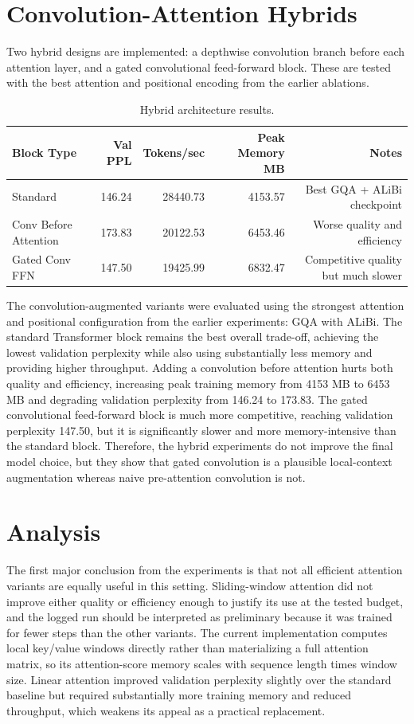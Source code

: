 \documentclass{article}
\begin{document}
\section{Convolution-Attention Hybrids}

Two hybrid designs are implemented: a depthwise convolution branch before each
attention layer, and a gated convolutional feed-forward block. These are tested
with the best attention and positional encoding from the earlier ablations.

\begin{table}[h]
\centering
\begin{tabular}{lrrrr}
\toprule
Block Type & Val PPL & Tokens/sec & Peak Memory MB & Notes \\
\midrule
Standard & 146.24 & 28440.73 & 4153.57 & Best GQA + ALiBi checkpoint \\
Conv Before Attention & 173.83 & 20122.53 & 6453.46 & Worse quality and efficiency \\
Gated Conv FFN & 147.50 & 19425.99 & 6832.47 & Competitive quality but much slower \\
\bottomrule
\end{tabular}
\caption{Hybrid architecture results.}
\end{table}

The convolution-augmented variants were evaluated using the strongest attention
and positional configuration from the earlier experiments: GQA with ALiBi. The
standard Transformer block remains the best overall trade-off, achieving the
lowest validation perplexity while also using substantially less memory and
providing higher throughput. Adding a convolution before attention hurts both
quality and efficiency, increasing peak training memory from 4153 MB to 6453 MB
and degrading validation perplexity from 146.24 to 173.83. The gated
convolutional feed-forward block is much more competitive, reaching validation
perplexity 147.50, but it is significantly slower and more memory-intensive than
the standard block. Therefore, the hybrid experiments do not improve the final
model choice, but they show that gated convolution is a plausible local-context
augmentation whereas naive pre-attention convolution is not.

\section{Analysis}

The first major conclusion from the experiments is that not all efficient
attention variants are equally useful in this setting. Sliding-window attention
did not improve either quality or efficiency enough to justify its use at the
tested budget, and the logged run should be interpreted as preliminary because
it was trained for fewer steps than the other variants. The current
implementation computes local key/value windows directly rather than
materializing a full attention matrix, so its attention-score memory scales with
sequence length times window size. Linear attention improved validation
perplexity slightly over the standard baseline but required substantially more
training memory and reduced throughput, which weakens its appeal as a practical
replacement.
\end{document}
